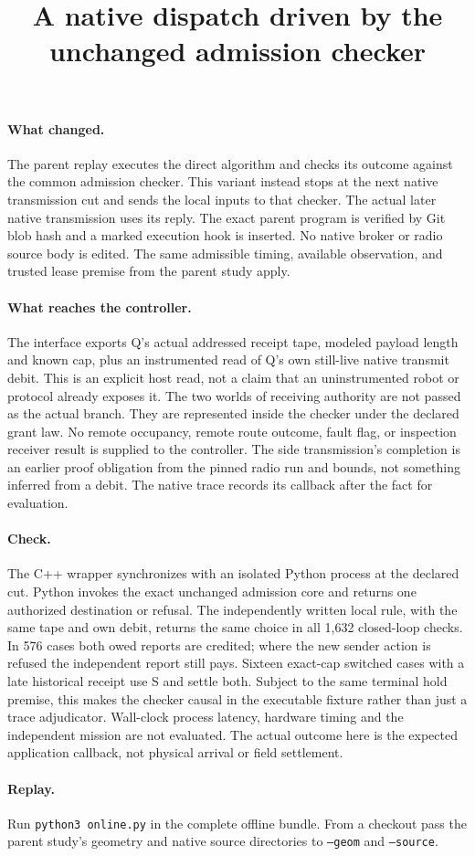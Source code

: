 \documentclass{article}
\title{A native dispatch driven by the unchanged admission checker}
\author{}
\date{}
\begin{document}
\maketitle
\paragraph{What changed.}
The parent replay executes the direct algorithm and checks its outcome
against the common admission checker. This variant instead stops at
the next native transmission cut and sends the local inputs to that
checker. The actual later native transmission uses its reply.
The exact parent program is verified by Git blob hash and a marked
execution hook is inserted. No native broker or radio source body is
edited. The same admissible timing, available observation, and trusted
lease premise from the parent study apply.

\paragraph{What reaches the controller.}
The interface exports Q's actual addressed receipt tape, modeled payload
length and known cap, plus an instrumented read of Q's own still-live
native transmit debit. This is an explicit host read, not a claim that
an uninstrumented robot or protocol already exposes it.
The two worlds of receiving authority are not passed as the actual
branch. They are represented inside the checker under the declared
grant law. No remote occupancy, remote route outcome, fault flag, or
inspection receiver result is supplied to the controller. The side
transmission's completion is an earlier proof obligation from the
pinned radio run and bounds, not something inferred from a debit.
The native trace records its callback after the fact for evaluation.

\paragraph{Check.}
The C++ wrapper synchronizes with an isolated Python process at the
declared cut. Python invokes the exact unchanged admission core and
returns one authorized destination or refusal. The independently
written local rule, with the same tape and own debit, returns the same
choice in all 1,632 closed-loop checks. In 576 cases both owed reports
are credited; where the new sender action is refused the independent
report still pays. Sixteen exact-cap switched cases with a late
historical receipt use S and settle both. Subject to the same terminal
hold premise, this makes the checker causal in the executable fixture
rather than just a trace adjudicator.
Wall-clock process latency, hardware timing and the independent
mission are not evaluated. The actual outcome here is the expected
application callback, not physical arrival or field settlement.

\paragraph{Replay.}
Run \texttt{python3 online.py} in the complete offline bundle. From
a checkout pass the parent study's geometry and native source
directories to \texttt{--geom} and \texttt{--source}.
\end{document}
